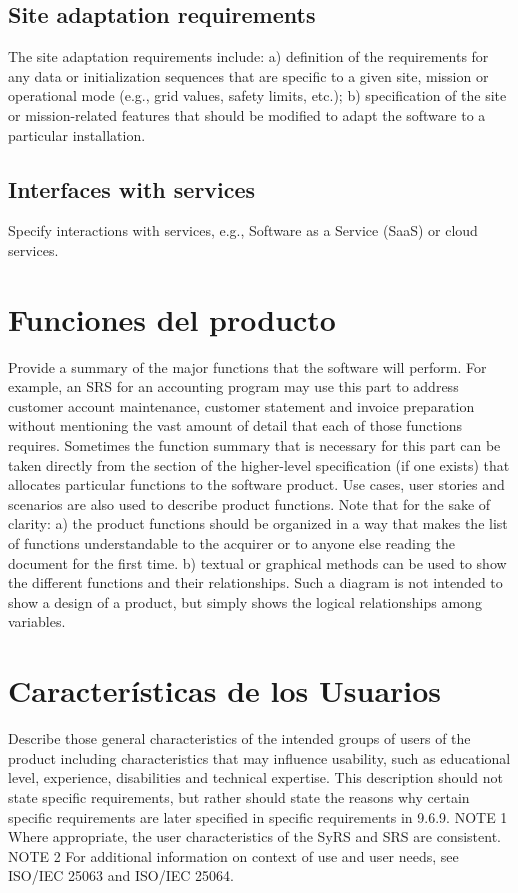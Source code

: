 \documentclass[12pt, a4paper, twoside]{article}
\begin{document}
 \subsection{Site adaptation requirements}
 The site adaptation requirements include:
 a) definition of the requirements for any data or initialization sequences that are specific to a given
 site, mission or operational mode (e.g., grid values, safety limits, etc.);
 b) specification of the site or mission-related features that should be modified to adapt the software
 to a particular installation.

 \subsection{Interfaces with services}
 Specify interactions with services, e.g., Software as a Service (SaaS) or cloud services.

 \section{Funciones del producto}
 Provide a summary of the major functions that the software will perform. For example, an SRS for an
 accounting program may use this part to address customer account maintenance, customer statement
 and invoice preparation without mentioning the vast amount of detail that each of those functions
 requires.
 Sometimes the function summary that is necessary for this part can be taken directly from the section
 of the higher-level specification (if one exists) that allocates particular functions to the software
 product.
 Use cases, user stories and scenarios are also used to describe product functions.
 Note that for the sake of clarity:
 a) the product functions should be organized in a way that makes the list of functions understandable
 to the acquirer or to anyone else reading the document for the first time.
 b) textual or graphical methods can be used to show the different functions and their relationships.
 Such a diagram is not intended to show a design of a product, but simply shows the logical
 relationships among variables.

 \section{Características de los Usuarios}
 Describe those general characteristics of the intended groups of users of the product including
 characteristics that may influence usability, such as educational level, experience, disabilities and
 technical expertise. This description should not state specific requirements, but rather should state the
 reasons why certain specific requirements are later specified in specific requirements in 9.6.9.
 NOTE 1 Where appropriate, the user characteristics of the SyRS and SRS are consistent.
 NOTE 2 For additional information on context of use and user needs, see ISO/IEC 25063 and ISO/IEC 25064.
\end{document}
